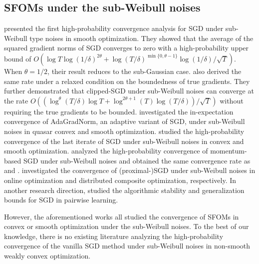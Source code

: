 \documentclass{article}
\begin{document}
\subsection{SFOMs under the sub-Weibull noises}
\cite{madden2020high} presented the first high-probability convergence analysis for SGD under sub-Weibull type noises in smooth optimization. They showed that the average of the squared gradient norms of SGD converges to zero with a high-probability upper bound of $O\left(\log T\log(1/\delta)^{2\theta}+\log(T/\delta)^{\min\{0,\theta-1\}}\log(1/\delta)/\sqrt{T}\right)$. When $\theta = 1/2$, their result reduces to the sub-Gaussian case. \cite{lishaojie_liuyong_2022} also derived the same rate under a relaxed condition on the boundedness of true gradients. They further demonstrated that clipped-SGD under sub-Weibull noises can converge at the rate $O((\log^\theta(T/\delta)\log T+\log^{2\theta+1} (T)\log(T/\delta))/\sqrt{T})$ without requiring the true gradients to be bounded. \cite{liu2022convergence} investigated the in-expectation convergence of AdaGradNorm, an adaptive variant of SGD, under sub-Weibull noises in quasar convex and smooth optimization. \cite{liu2024revisitinglastiterateconvergencestochastic} studied the high-probability convergence of the last iterate of SGD under sub-Weibull noises in convex and smooth optimization. \cite{li2025sharper} analyzed the high-probability convergence of momentum-based SGD under sub-Weibull noises and obtained the same convergence rate as \citep{madden2020high} and \citep{lishaojie_liuyong_2022}. \cite{9758044,yu2025distributed} investigated the convergence of (proximal-)SGD under sub-Weibull noises in online optimization and distributed composite optimization, respectively. In another research direction, \cite{chen2025error} studied the algorithmic stability and generalization bounds for SGD in pairwise learning. 

However, the aforementioned works all studied the convergence of SFOMs in convex or smooth optimization under the sub-Weibull noises. To the best of our knowledge, there is no existing literature analyzing the high-probability convergence of the vanilla SGD method under sub-Weibull noises in non-smooth weakly convex optimization.
\end{document}
